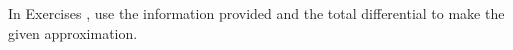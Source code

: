 {\noindent In Exercises}
{, use the information provided and the total differential to make the given approximation.}
